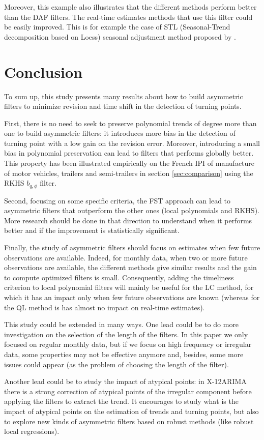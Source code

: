\documentclass[
  12pt,
  ,
  a4paper]{article}
\newcommand\1{\mathds{1}}
\begin{document}
Moreover, this example also illustrates that the different methods perform better than the DAF filters.
The real-time estimates methods that use this filter could be easily improved.
This is for example the case of STL (Seasonal-Trend decomposition based on Loess) seasonal adjustment method proposed by \textcite{cleveland90}.

\newpage

\hypertarget{conclusion}{%
\section*{Conclusion}\label{conclusion}}

To sum up, this study presents many results about how to build asymmetric filters to minimize revision and time shift in the detection of turning points.

First, there is no need to seek to preserve polynomial trends of degree more than one to build asymmetric filters: it introduces more bias in the detection of turning point with a low gain on the revision error. Moreover, introducing a small bias in polynomial preservation can lead to filters that performs globally better.
This property has been illustrated empirically on the French IPI of manufacture of motor vehicles, trailers and semi-trailers in section \ref{sec:comparison} using the RKHS \(b_{q,\phi}\) filter.

Second, focusing on some specific criteria, the FST approach can lead to asymmetric filters that outperform the other ones (local polynomials and RKHS).
More research should be done in that direction to understand when it performs better and if the improvement is statistically significant.

Finally, the study of asymmetric filters should focus on estimates when few future observations are available.
Indeed, for monthly data, when two or more future observations are available, the different methods give similar results and the gain to compute optimized filters is small.
Consequently, adding the timeliness criterion to local polynomial filters will mainly be useful for the LC method, for which it has an impact only when few future observations are known (whereas for the QL method is has almost no impact on real-time estimates).

This study could be extended in many ways.
One lead could be to do more investigation on the selection of the length of the filters.
In this paper we only focused on regular monthly data, but if we focus on high frequency or irregular data, some properties may not be effective anymore and, besides, some more issues could appear (as the problem of choosing the length of the filter).

Another lead could be to study the impact of atypical points: in X-12ARIMA there is a strong correction of atypical points of the irregular component before applying the filters to extract the trend.
It encourages to study what is the impact of atypical points on the estimation of trends and turning points, but also to explore new kinds of asymmetric filters based on robust methods (like robust local regressions).

\newpage

\printbibliography
\end{document}
